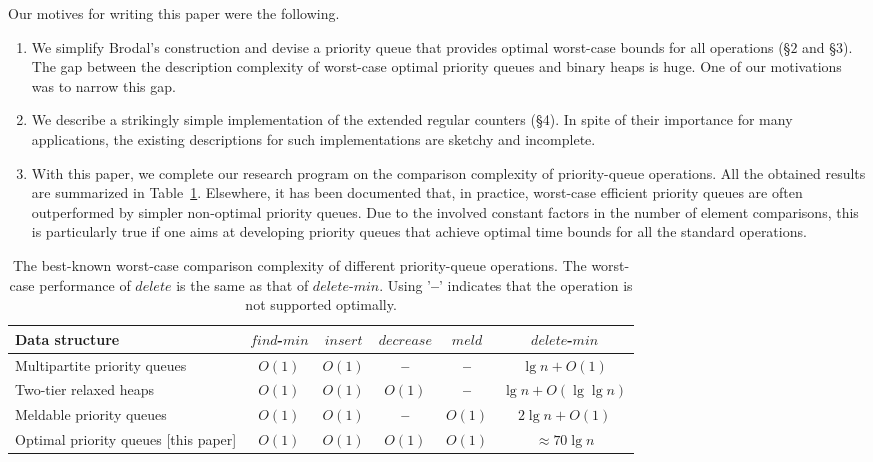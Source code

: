\documentclass{llncs}
\newcommand{\Findmin}{\mbox{$\mathit{find}$\mbox{\rm -}$\mathit{min}$}}
\newcommand{\Insert}{\mbox{$\mathit{insert}$}}
\newcommand{\Deletemin}{\mbox{$\mathit{delete}$\mbox{\rm -}$\mathit{min}$}}
\newcommand{\Decrease}{\mbox{$\mathit{decrease}$}}
\newcommand{\Delete}{\mbox{$\mathit{delete}$}}
\newcommand{\Meld}{\mbox{$\mathit{meld}$}}
\begin{document}
Our motives for writing this paper were the following. 
\begin{enumerate}
\item We simplify Brodal's construction and devise a priority queue
  that provides optimal worst-case bounds for all operations (\S $2$ and \S $3$). 
The gap between the description complexity of worst-case optimal priority queues 
  and binary heaps \cite{Wil64} is huge.  One of our motivations was to narrow this gap.
\item We describe a strikingly simple implementation of the extended regular counters (\S 4).  
  In spite of their importance for many applications, the existing descriptions \cite{CK77,KST02}
  for such implementations are sketchy and incomplete. 
\item With this paper, we complete our research program on the
  comparison complexity of priority-queue operations. All the obtained
  results are summarized in Table~\ref{table:results}.  Elsewhere, it
  has been documented that, in practice, worst-case efficient priority
  queues are often outperformed by simpler non-optimal priority queues.
  Due to the involved constant factors in the number of element comparisons, 
  this is particularly true if one aims at developing priority queues that 
  achieve optimal time bounds for all the standard operations.
\end{enumerate} 

\begin{table}[tb]
\caption{The best-known worst-case comparison complexity of different 
	priority-queue operations. The worst-case performance of \Delete{} is the same as 
	that of \Deletemin{}. 
	Using '\textbf{--}' indicates that the operation is not supported optimally.
\label{table:results}}
  
\begin{center}
\begin{tabular}{@{}|p{5.5cm}|c|c|c|c|c|@{}}
\hline
\textbf{Data structure} 
& \Findmin{}
& \Insert{}
& \Decrease{}
& \Meld{}
& \Deletemin{}\\
\hline
Multipartite priority queues \cite{EJK08b}
& $O(1)$
& $O(1)$
& \textbf{--}
& \textbf{--}
& $\lg n + O(1)$\\
\hline
Two-tier relaxed heaps \cite{EJK08a}
& $O(1)$
& $O(1)$
& $O(1)$
& \textbf{--}
& $\lg n + O(\lg\lg n)$\\
\hline
Meldable priority queues \cite{EJK10b}
& $O(1)$
& $O(1)$
& \textbf{--}
& $O(1)$
& $2\lg n + O(1)$\\
\hline
Optimal priority queues [this paper]
& $O(1)$
& $O(1)$
& $O(1)$
& $O(1)$
& $\approx 70\lg n$\\
\hline
\end{tabular}
\end{center}
\vspace{-.2in}
\end{table}
\end{document}
